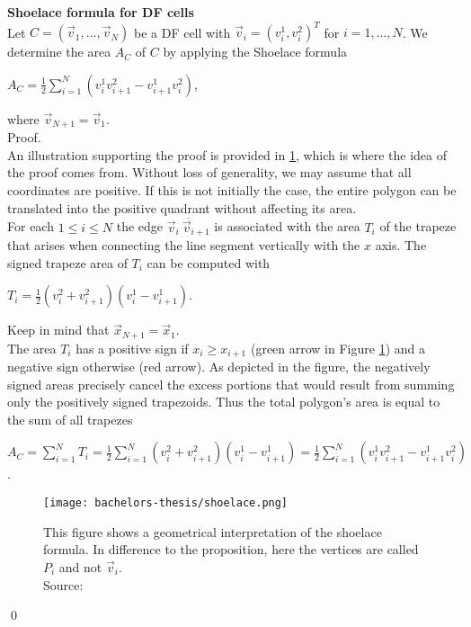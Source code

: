 \begin{proposition}  \textbf{Shoelace formula for DF cells} \label{prop:Shoelace}\\ 
	Let $C = (\vec{v}_1, \ldots, \vec{v}_N)$ be a DF cell with $\vec{v}_i = (v_i^1, v_i^2)^T$ for $i=1,\ldots,N$.
	We determine the area $A_C$ of $C$ by applying the Shoelace formula
	\begin{center}
		$A_C = \frac{1}{2}\sum\limits_{i = 1}^{N} (v_i^1 v_{i+1}^2 - v_{i+1}^1 v_i^2)$,
	\end{center} 
	where $\vec{v}_{N + 1} = \vec{v}_1$. \\
	Proof. 	\\
	An illustration supporting the proof is provided in \ref{fig:shoelace}, which is where the idea of the proof comes from. 
	Without loss of generality, we may assume that all coordinates are positive.
	If this is not initially the case, the entire polygon can be translated into the positive quadrant without affecting its area. \\
	For each $1 \leq i \leq N$ the edge $\overline{ \vec{v}_i \: \vec{v}_{i+1}}$ is associated with the area $T_i$ of the trapeze that arises when connecting the line segment vertically with the $x$ axis. 
	The signed trapeze area of $T_i$ can be computed with 
	\begin{center}
		$T_i = \frac{1}{2} (v_i^2 + v_{i+1}^2)(v_i^1 - v_{i+1}^1)$.
	\end{center}
	Keep in mind that $\vec{x}_{N + 1} = \vec{x}_1$. \\
	The area $T_i$ has a positive sign if $x_i \geq x_{i+1}$ (green arrow in Figure \ref{fig:shoelace}) and a negative sign otherwise (red arrow). 
	As depicted in the figure, the negatively signed areas precisely cancel the excess portions that would result from summing only the positively signed trapezoids.
	Thus the total polygon's area is equal to the sum of all trapezes
	\begin{center}
		$A_C = \sum\limits_{i = 1}^{N} T_i = \frac{1}{2} \sum\limits_{i = 1}^{N} (v_i^2 + v_{i+1}^2)(v_i^1 - v_{i+1}^1) = \frac{1}{2}\sum\limits_{i = 1}^{N} (v_i^1 v_{i+1}^2 - v_{i+1}^1 v_i^2) $.
	\end{center} 
	\begin{figure}
		\begin{center}
			\texttt{[image: bachelors-thesis/shoelace.png]}
			\caption{
				This figure shows a geometrical interpretation of the shoelace formula. In difference to the proposition, here the vertices are called $P_i$ and not $\vec{v}_i$. \\
				Source: \cite{ShoelaceFigure2022}}
			\label{fig:shoelace}
		\end{center}
	\end{figure}
	\qed
\end{proposition}

